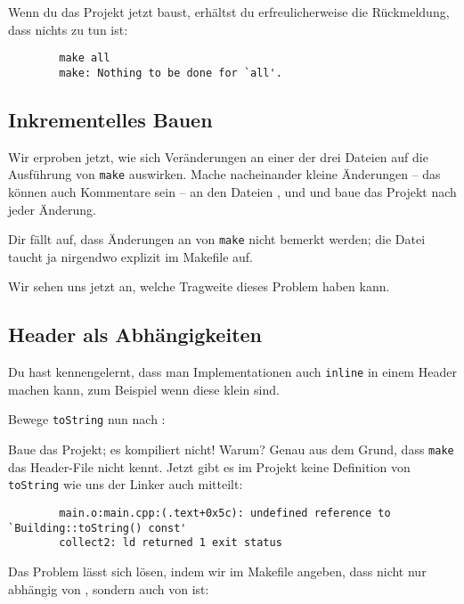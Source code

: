 Wenn du das Projekt jetzt baust, erhältst du erfreulicherweise die Rückmeldung, dass nichts zu tun ist:
\begin{verbatim}
        make all
        make: Nothing to be done for `all'.
\end{verbatim}

\subsection{Inkrementelles Bauen}
Wir erproben jetzt, wie sich Veränderungen an einer der drei Dateien auf die Ausführung von \texttt{make} auswirken.
Mache nacheinander kleine Änderungen -- das können auch Kommentare sein -- an den Dateien ,  und  und baue das Projekt nach jeder Änderung.

Dir fällt auf, dass Änderungen an  von \texttt{make} nicht bemerkt werden; die Datei taucht ja nirgendwo explizit im Makefile auf.

Wir sehen uns jetzt an, welche Tragweite dieses Problem haben kann.

\subsection{Header als Abhängigkeiten}
Du hast kennengelernt, dass man Implementationen auch \texttt{inline} in einem Header machen kann, zum Beispiel wenn diese klein sind.

Bewege \lstinline{toString} nun nach :


Baue das Projekt; es kompiliert nicht! Warum? Genau aus dem Grund, dass \texttt{make} das Header-File nicht \glqq kennt\grqq{}.
Jetzt gibt es im Projekt keine Definition von \lstinline{toString} wie uns der Linker auch mitteilt:

\begin{verbatim}
        main.o:main.cpp:(.text+0x5c): undefined reference to `Building::toString() const'
        collect2: ld returned 1 exit status
\end{verbatim}

Das Problem lässt sich lösen, indem wir im Makefile angeben, dass  nicht nur abhängig von , sondern auch von  ist:


